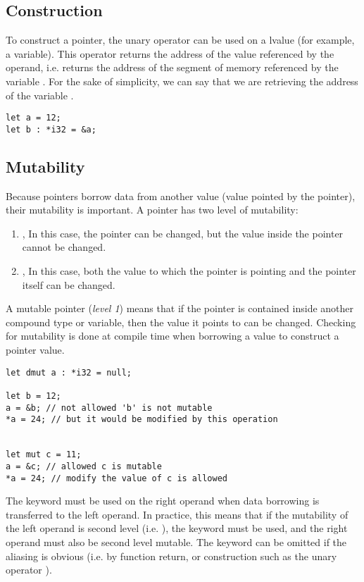 \subsection {Construction}

To construct a pointer, the unary operator \token{\&} can be used on a lvalue
(for example, a variable). This operator returns the address of the value
referenced by the operand, i.e.  returns the address of the segment
of memory referenced by the variable . For the sake of simplicity, we
can say that we are retrieving the address of the variable .

\begin{lstlisting}[style=coloredverbatim]
let a = 12;
let b : *i32 = &a;
\end{lstlisting}

\subsection {Mutability}

Because pointers borrow data from another value (value pointed by the pointer),
their mutability is important. A pointer has two level of mutability:
\begin{enumerate}
\item {}, In this case, the pointer can be changed, but the value
  inside the pointer cannot be changed.
\item {}, In this case, both the value to which the pointer
  is pointing and the pointer itself can be changed.
\end{enumerate}

A mutable pointer (\textit{level 1}) means that if the pointer is contained
inside another compound type or variable, then the value it points to can be
changed. Checking for mutability is done at compile time when borrowing a value
to construct a pointer value.
\smallskip

\begin{lstlisting}[style=coloredverbatim]
let dmut a : *i32 = null;

let b = 12;
a = &b; // not allowed 'b' is not mutable
*a = 24; // but it would be modified by this operation


let mut c = 11;
a = &c; // allowed c is mutable
*a = 24; // modify the value of c is allowed
\end{lstlisting}

\smallskip
The keyword  must be used on the right operand when data borrowing
is transferred to the left operand. In practice, this means that if the
mutability of the left operand is second level (i.e. ), the
keyword  must be used, and the right operand must also be second
level mutable. The keyword can be omitted if the aliasing is obvious (i.e. by
function return, or construction such as the unary operator \token{\&}).

